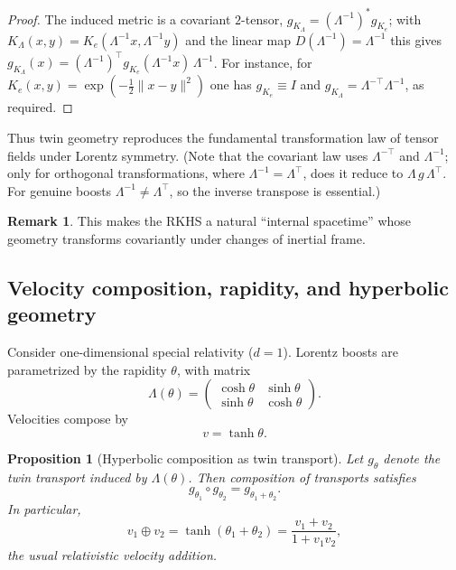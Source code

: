 \documentclass[11pt]{article}
\newtheorem{proposition}[theorem]{Proposition}
\theoremstyle{definition}
\newtheorem{remark}[theorem]{Remark}
\begin{document}
	\begin{proof}
		The induced metric is a covariant $2$-tensor, $g_{K_\Lambda}=(\Lambda^{-1})^\ast g_{K_e}$; with $K_\Lambda(x,y)=K_e(\Lambda^{-1}x,\Lambda^{-1}y)$ and the linear map $D(\Lambda^{-1})=\Lambda^{-1}$ this gives $g_{K_\Lambda}(x)=(\Lambda^{-1})^\top g_{K_e}(\Lambda^{-1}x)\,\Lambda^{-1}$. For instance, for $K_e(x,y)=\exp(-\tfrac12\|x-y\|^2)$ one has $g_{K_e}\equiv I$ and $g_{K_\Lambda}=\Lambda^{-\top}\Lambda^{-1}$, as required.
	\end{proof}

	Thus twin geometry reproduces the fundamental transformation law of tensor fields under Lorentz symmetry. (Note that the covariant law uses $\Lambda^{-\top}$ and $\Lambda^{-1}$; only for orthogonal transformations, where $\Lambda^{-1}=\Lambda^\top$, does it reduce to $\Lambda\,g\,\Lambda^\top$. For genuine boosts $\Lambda^{-1}\neq\Lambda^\top$, so the inverse transpose is essential.)
	
	\begin{remark}
		This makes the RKHS a natural “internal spacetime” whose geometry transforms covariantly under changes of inertial frame.
	\end{remark}
	
	\subsection{Velocity composition, rapidity, and hyperbolic geometry}
	
	Consider one-dimensional special relativity ($d=1$).
	Lorentz boosts are parametrized by the rapidity $\theta$, with matrix
	\[
	\Lambda(\theta)=
	\begin{pmatrix}
		\cosh\theta & \sinh\theta\\
		\sinh\theta & \cosh\theta
	\end{pmatrix}.
	\]
	Velocities compose by
	\[
	v = \tanh\theta.
	\]
	
	\begin{proposition}[Hyperbolic composition as twin transport]
		Let $g_\theta$ denote the twin transport induced by $\Lambda(\theta)$.
		Then composition of transports satisfies
		\[
		g_{\theta_1}\circ g_{\theta_2} = g_{\theta_1+\theta_2}.
		\]
		In particular,
		\[
		v_1 \oplus v_2
		= \tanh(\theta_1+\theta_2)
		= \frac{v_1+v_2}{1+v_1 v_2},
		\]
		the usual relativistic velocity addition.
	\end{proposition}
	
\end{document}
